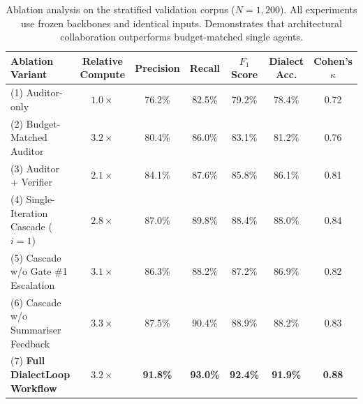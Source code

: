 
\begin{table}[t]
\centering
\small
\caption{Ablation analysis on the stratified validation corpus ($N=1{,}200$). All experiments use frozen backbones and identical inputs. Demonstrates that architectural collaboration outperforms budget-matched single agents.}
\label{tab:ablation_study}
\begin{tabular}{lcccccc}
\toprule
\textbf{Ablation Variant} & \textbf{Relative Compute} & \textbf{Precision} & \textbf{Recall} & \textbf{$F_1$ Score} & \textbf{Dialect Acc.} & \textbf{Cohen's $\kappa$} \\
\midrule
(1) Auditor-only & $1.0\times$ & 76.2\% & 82.5\% & 79.2\% & 78.4\% & 0.72 \\
(2) Budget-Matched Auditor & $3.2\times$ & 80.4\% & 86.0\% & 83.1\% & 81.2\% & 0.76 \\
(3) Auditor + Verifier & $2.1\times$ & 84.1\% & 87.6\% & 85.8\% & 86.1\% & 0.81 \\
(4) Single-Iteration Cascade ($i=1$) & $2.8\times$ & 87.0\% & 89.8\% & 88.4\% & 88.0\% & 0.84 \\
(5) Cascade w/o Gate \#1 Escalation & $3.1\times$ & 86.3\% & 88.2\% & 87.2\% & 86.9\% & 0.82 \\
(6) Cascade w/o Summariser Feedback & $3.3\times$ & 87.5\% & 90.4\% & 88.9\% & 88.2\% & 0.83 \\
\midrule
(7) \textbf{Full DialectLoop Workflow} & $3.2\times$ & \textbf{91.8\%} & \textbf{93.0\%} & \textbf{92.4\%} & \textbf{91.9\%} & \textbf{0.88} \\
\bottomrule
\end{tabular}
\end{table}
